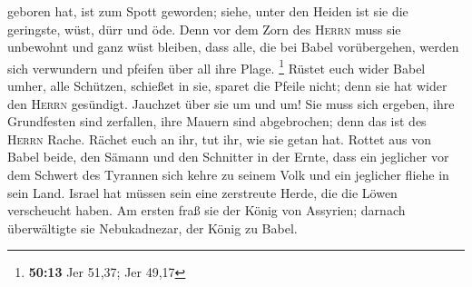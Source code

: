 geboren hat, ist zum Spott geworden; siehe, unter den Heiden ist sie die
geringste, wüst, dürr und öde.  Denn vor dem Zorn des
\textsc{Herrn} muss sie unbewohnt und ganz wüst bleiben, dass alle, die
bei Babel vorübergehen, werden sich verwundern und pfeifen über all ihre
Plage. \footnote{\textbf{50:13} Jer 51,37; Jer 49,17} 
Rüstet euch wider Babel umher, alle Schützen, schießet in sie, sparet
die Pfeile nicht; denn sie hat wider den \textsc{Herrn} gesündigt.
 Jauchzet über sie um und um! Sie muss sich ergeben, ihre
Grundfesten sind zerfallen, ihre Mauern sind abgebrochen; denn das ist
des \textsc{Herrn} Rache. Rächet euch an ihr, tut ihr, wie sie getan
hat.  Rottet aus von Babel beide, den Sämann und den
Schnitter in der Ernte, dass ein jeglicher vor dem Schwert des Tyrannen
sich kehre zu seinem Volk und ein jeglicher fliehe in sein Land.
 Israel hat müssen sein eine zerstreute Herde, die die
Löwen verscheucht haben. Am ersten fraß sie der König von Assyrien;
darnach überwältigte sie Nebukadnezar, der König zu Babel.

